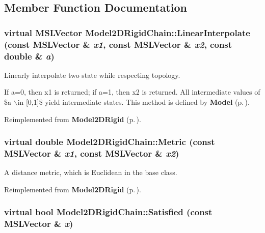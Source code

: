 \subsection{Member Function Documentation}
\subsubsection{\setlength{\rightskip}{0pt plus 5cm}virtual {\bf MSLVector} Model2DRigid\-Chain::Linear\-Interpolate (const {\bf MSLVector} \& {\em x1}, const {\bf MSLVector} \& {\em x2}, const double \& {\em a})\hspace{0.3cm}{\tt  [virtual]}}\label{class_Model2DRigidChain_a4}


Linearly interpolate two state while respecting topology.

If a=0, then x1 is returned; if a=1, then x2 is returned. All intermediate values of \$a $\backslash$in [0,1]\$ yield intermediate states. This method is defined by {\bf Model} {\rm (p.\,\pageref{class_Model})}. 

Reimplemented from {\bf Model2DRigid} {\rm (p.\,\pageref{class_Model2DRigid_a4})}.
\subsubsection{\setlength{\rightskip}{0pt plus 5cm}virtual double Model2DRigid\-Chain::Metric (const {\bf MSLVector} \& {\em x1}, const {\bf MSLVector} \& {\em x2})\hspace{0.3cm}{\tt  [virtual]}}\label{class_Model2DRigidChain_a5}


A distance metric, which is Euclidean in the base class.



Reimplemented from {\bf Model2DRigid} {\rm (p.\,\pageref{class_Model2DRigid_a5})}.
\subsubsection{\setlength{\rightskip}{0pt plus 5cm}virtual bool Model2DRigid\-Chain::Satisfied (const {\bf MSLVector} \& {\em x})\hspace{0.3cm}{\tt  [virtual]}}\label{class_Model2DRigidChain_a6}



